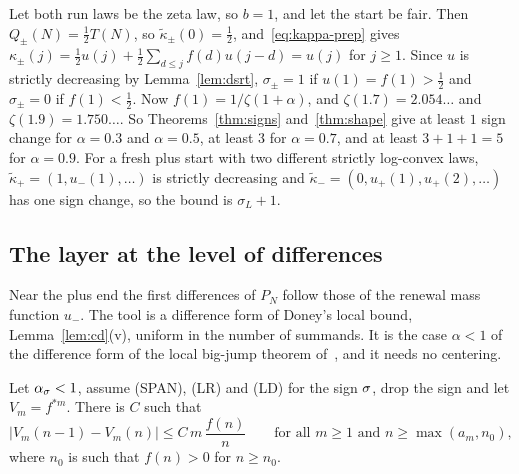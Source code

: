 \begin{example}\label{ex:counts}
Let both run laws be the zeta law, so $b=1$, and let the start be fair. Then
$Q_\pm(N)=\frac12T(N)$, so $\widetilde\kappa_\pm(0)=\frac12$, and~\eqref{eq:kappa-prep} gives
$\kappa_\pm(j)=\frac12u(j)+\frac12\sum_{d\le j}f(d)u(j-d)=u(j)$ for $j\ge1$. Since $u$ is strictly
decreasing by Lemma~\ref{lem:dsrt}, $\sigma_\pm=1$ if $u(1)=f(1)>\frac12$ and $\sigma_\pm=0$ if
$f(1)<\frac12$. Now $f(1)=1/\zeta(1+\alpha)$, and $\zeta(1.7)=2.054\ldots$ and
$\zeta(1.9)=1.750\ldots$. So Theorems~\ref{thm:signs} and~\ref{thm:shape} give at least $1$
sign change for $\alpha=0.3$ and $\alpha=0.5$, at least $3$ for $\alpha=0.7$, and at least
$3+1+1=5$ for $\alpha=0.9$. For a fresh plus start with two different strictly log-convex laws,
$\widetilde\kappa_\plus=(1,u_\minus(1),\dots)$ is strictly decreasing and
$\widetilde\kappa_\minus=(0,u_\plus(1),u_\plus(2),\dots)$ has one sign change, so the bound is
$\sigma_L+1$.
\end{example}

\subsection{The layer at the level of differences}\label{sec:layer-diff}

Near the plus end the first differences of $P_N$ follow those of the renewal mass function
$u_\minus$. The tool is a difference form of Doney's local bound, Lemma~\ref{lem:cd}(v),
uniform in the number of summands. It is the case $\alpha<1$ of the difference form of the local
big-jump theorem of~\cite[Section~6]{paperF}, and it needs no centering.

\begin{lemma}\label{lem:Lstar}
Let $\alpha_\sigma<1$, assume (SPAN), (LR) and (LD) for the sign $\sigma$, drop the sign and let
$V_m=f^{*m}$. There is $C$ such that
\[
 |V_m(n-1)-V_m(n)|\le C\,m\,\frac{f(n)}n\qquad\text{for all }m\ge1\text{ and }n\ge\max(a_m,n_0),
\]
where $n_0$ is such that $f(n)>0$ for $n\ge n_0$.
\end{lemma}

